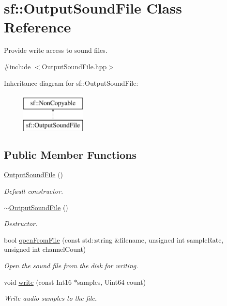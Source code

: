 \hypertarget{classsf_1_1_output_sound_file}{}\section{sf\+:\+:Output\+Sound\+File Class Reference}
\label{classsf_1_1_output_sound_file}


Provide write access to sound files.  




{\ttfamily \#include $<$Output\+Sound\+File.\+hpp$>$}

Inheritance diagram for sf\+:\+:Output\+Sound\+File\+:\begin{figure}[H]
\begin{center}
\leavevmode
\includegraphics[height=2.000000cm]{classsf_1_1_output_sound_file}
\end{center}
\end{figure}
\subsection*{Public Member Functions}
\begin{DoxyCompactItemize}
\item 
\mbox{\hyperlink{classsf_1_1_output_sound_file_a7ae9f2dbd0991fa9394726a3d58bb19e}{Output\+Sound\+File}} ()
\begin{DoxyCompactList}\small\item\em Default constructor. \end{DoxyCompactList}\item 
\mbox{\hyperlink{classsf_1_1_output_sound_file_a1492adbfef1f391d720afb56f068182e}{$\sim$\+Output\+Sound\+File}} ()
\begin{DoxyCompactList}\small\item\em Destructor. \end{DoxyCompactList}\item 
bool \mbox{\hyperlink{classsf_1_1_output_sound_file_ae5e55f01c53c1422c44eaed2eed67fce}{open\+From\+File}} (const std\+::string \&filename, unsigned int sample\+Rate, unsigned int channel\+Count)
\begin{DoxyCompactList}\small\item\em Open the sound file from the disk for writing. \end{DoxyCompactList}\item 
void \mbox{\hyperlink{classsf_1_1_output_sound_file_adfcf525fced71121f336fa89faac3d67}{write}} (const Int16 $\ast$samples, Uint64 count)
\begin{DoxyCompactList}\small\item\em Write audio samples to the file. \end{DoxyCompactList}\end{DoxyCompactItemize}
